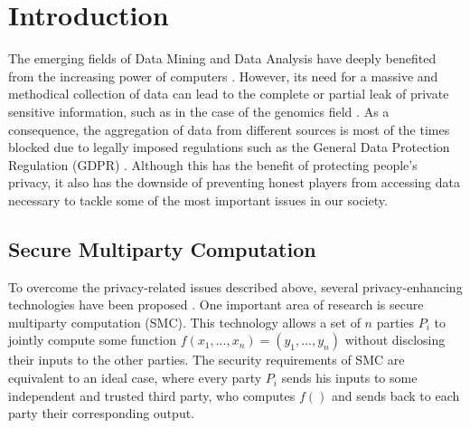 


%

\chapter{Introduction}

The emerging fields of Data Mining and Data Analysis have deeply benefited from the increasing power of computers \cite{Wang11}. However, its need for a massive and methodical collection of data can lead to the complete or partial leak of private sensitive information, such as in the case of the genomics field \cite{NS08, L02, Homer08, Gymrek13}. As a consequence, the aggregation of data from different sources is most of the times blocked due to legally imposed regulations such as the General Data Protection Regulation (GDPR) \cite{EUdataregulations2016}. Although this has the benefit of protecting people's privacy, it also has the downside of preventing honest players from accessing data necessary to tackle some of the most important issues in our society. 

\section*{Secure Multiparty Computation}


To overcome the privacy-related issues described above, several privacy-enhancing technologies have been proposed \cite{Li2016, Armknecht2015, Yao82}. One important area of research is secure multiparty computation (SMC). This technology allows a set of $n$ parties $P_i$ to jointly compute some function $f( x_1, ..., x_n ) = (y_1, ..., y_n)$ without disclosing their inputs to the other parties. The security requirements of SMC are equivalent to an ideal case, where every party $P_i$ sends his inputs to some independent and trusted third party, who computes $f()$ and sends back to each party their corresponding output.


